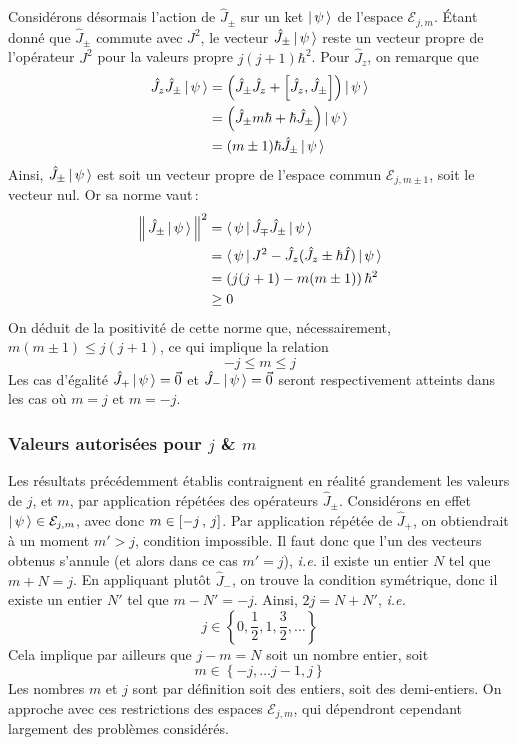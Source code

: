Considérons désormais l’action de $\hat{J}_{\pm}$ sur un ket $\left| \, \psi \, \right> $ de l’espace $\mathcal{E}_{j,m}$. Étant donné que $\hat{J}_{\pm}$ commute avec $J^2$, le vecteur $\hat{J}_{\pm} \left| \, \psi \, \right> $ reste un vecteur propre de l’opérateur $J^2$ pour la valeurs propre $j(j+1)\hbar^2$. Pour $\hat{J}_z$, on remarque que
\begin{align*}
    \hat{J}_z \hat{J}_{\pm} \left| \, \psi \, \right>
     & = \left(\hat{J}_{\pm} \hat{J}_z + \left[\hat{J}_z, \hat{J}_{\pm}\right]\right) \left| \, \psi \, \right> \\
     & = \left(\hat{J}_{\pm} m \hbar + \hbar \hat{J}_{\pm}\right) \left| \, \psi \, \right>                     \\
     & = (m \pm 1) \hbar \hat{J}_{\pm} \left| \, \psi \, \right>
\end{align*}
Ainsi, $\hat{J}_{\pm} \left| \, \psi \, \right>$ est soit un vecteur propre de l’espace commun $\mathcal{E}_{j, m \pm 1}$, soit le vecteur nul. Or sa norme vaut :
\begin{align*}
    \left\lVert \, \hat{J}_{\pm} \left| \, \psi \, \right> \, \right\rVert^2
     & = \left< \, \psi \, \right| \hat{J}_{\mp} \hat{J}_{\pm} \left| \, \psi \, \right>                   \\
     & = \left< \, \psi \, \right| J^2 - \hat{J}_z (\hat{J}_z \pm \hbar \hat{I}) \left| \, \psi \, \right> \\
     & = \left(j(j+1) - m(m\pm 1)\right)\hbar^2                              \\
     & \geq 0
\end{align*}
On déduit de la positivité de cette norme que, nécessairement, $m(m\pm1) \leq j(j+1)$, ce qui implique la relation
\[ -j \leq m \leq j \]
Les cas d’égalité $\hat{J}_+ \left| \, \psi \, \right> = \vec{0}$ et $\hat{J}_- \left| \, \psi \, \right>= \vec{0}$ seront respectivement atteints dans les cas où $m = j$ et $m = -j$.

\subsubsection{Valeurs autorisées pour $j$ \& $m$}

Les résultats précédemment établis contraignent en réalité grandement les valeurs de $j$, et $m$, par application répétées des opérateurs $\hat{J}_{\pm}$. Considérons en effet $\left| \, \psi \, \right> \in \mathcal{E}_{j,m}$, avec donc $m \in \left[ -j \, , \, j \right]$. Par application répétée de $\hat{J}_+$, on obtiendrait à un moment $m' > j$, condition impossible. Il faut donc que l’un des vecteurs obtenus s’annule (et alors dans ce cas $m' = j$), \textit{i.e.} il existe un entier $N$ tel que $m + N = j$. En appliquant plutôt $\hat{J}_-$, on trouve la condition symétrique, donc il existe un entier $N'$ tel que $m - N' = -j$. Ainsi, $2j = N + N'$, \textit{i.e.}
\[ j \in \left\{0, \frac{1}{2}, 1, \frac{3}{2}, \ldots\right\} \]
Cela implique par ailleurs que $j - m = N$ soit un nombre entier, soit
\[ m \in \left\{-j, \ldots j-1 , j\right\} \]
Les nombres $m$ et $j$ sont par définition soit des entiers, soit des demi-entiers. On approche avec ces restrictions des espaces $\mathcal{E}_{j,m}$, qui dépendront cependant largement des problèmes considérés.


